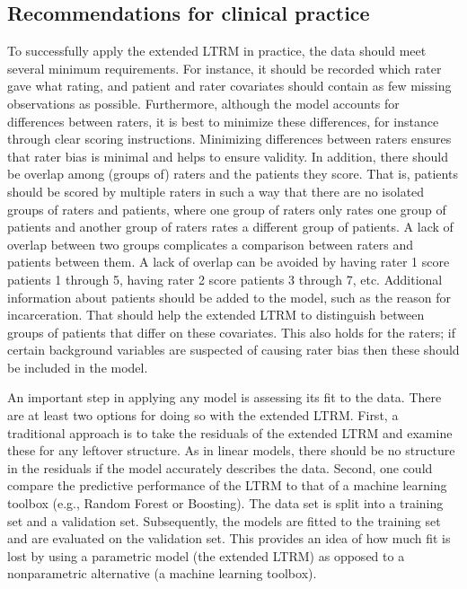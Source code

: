 \documentclass[a4paper,usenames,dvipsnames]{article}
\newenvironment{revision}{\color{black}}{\color{black}}
\begin{document}
\subsection*{Recommendations for clinical practice}
To successfully apply the extended LTRM in practice, the data should meet several minimum requirements. 
\protect\begin{revision}%
For instance, it should be recorded which rater gave what rating, and patient and rater covariates should contain as few missing observations as possible.
\protect\end{revision}%
\protect\begin{revision}Furthermore, \protect\end{revision}although the model accounts for differences between raters, it is best to minimize these differences, for instance through clear scoring instructions. Minimizing differences between raters ensures that rater bias is minimal and helps to ensure validity. In addition, there should be overlap among (groups of) raters and the patients they score. That is, patients should be scored by multiple raters in such a way that there are no isolated groups of raters and patients, where one group of raters only rates one group of patients and another group of raters rates a different group of patients. A lack of overlap between two groups complicates a comparison between raters and patients between them. A lack of overlap can be avoided by having rater 1 score patients 1 through 5, having rater 2 score patients 3 through 7, etc. Additional information about patients should be added to the model, such as the reason for incarceration. That should help the extended LTRM to distinguish between groups of patients that differ on these covariates. This also holds for the raters; if certain background variables are suspected of causing rater bias then these should be included in the model.

\protect\begin{revision}
An important step in applying any model is assessing its fit to the data.
There are at least two options for doing so with the extended LTRM.
First, a traditional approach is to take the residuals of the extended LTRM and examine these for any leftover structure.
As in linear models, there should be no structure in the residuals if the model accurately describes the data.
Second, one could compare the predictive performance of the LTRM to that of a machine learning toolbox (e.g., Random Forest or Boosting).
The data set is split into a training set and a validation set. 
Subsequently, the models are fitted to the training set and are evaluated on the validation set.
This provides an idea of how much fit is lost by using a parametric model (the extended LTRM) as opposed to a nonparametric alternative (a machine learning toolbox).
\protect\end{revision}%
\end{document}
